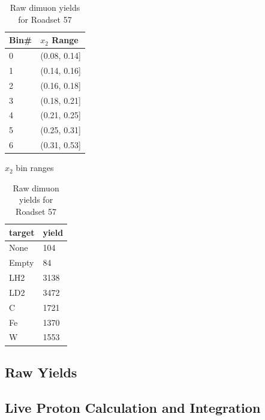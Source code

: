 \begin{table}
	\centering
	\setlength\tabcolsep{4pt}
\begin{minipage}{0.48\textwidth}
	\centering
	\begin{tabular}{ll}
		\toprule
		Bin\# & $x_2$ Range\\
		\midrule
		0 & (0.08, 0.14] \\
		1 & (0.14, 0.16] \\
		2 & (0.16, 0.18] \\
		3 & (0.18, 0.21] \\
		4 & (0.21, 0.25] \\
		5 & (0.25, 0.31] \\
		6 & (0.31, 0.53] \\
		\bottomrule
	\end{tabular}
	\caption{$x_2$ bin ranges}
	\label{tab:x2bins} 
\end{minipage}%
\hfill
\begin{minipage}{0.48\textwidth}
	\centering
	\begin{tabular}{ll}
		\toprule
		target & yield \\ 
		\midrule
		None   &  104 \\
		Empty  &  84 \\
		LH2    &  3138 \\
		LD2    &  3472 \\
		C      &  1721 \\ 
		Fe     &  1370 \\
		W      &  1553 \\
		\bottomrule
	\end{tabular}
	\caption{Raw dimuon yields for Roadset 57} 
	\label{tab:targyields} 
\end{minipage}
\end{table}

\subsection{Raw Yields}


\subsection{Live Proton Calculation and Integration}


